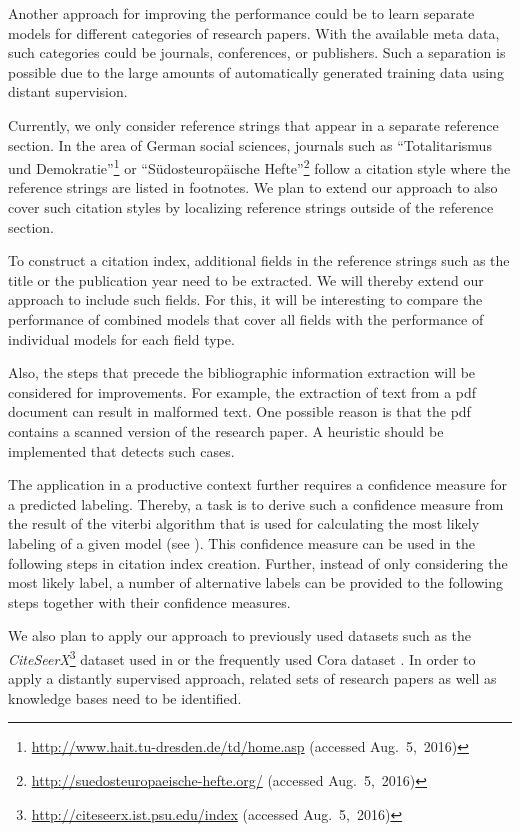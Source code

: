 Another approach for improving the performance could be to learn separate models for different categories of research papers.
With the available meta data, such categories could be journals, conferences, or publishers.
Such a separation is possible due to the large amounts of automatically generated training data using distant supervision.

Currently, we only consider reference strings that appear in a separate reference section.
In the area of German social sciences, journals such as ``Totalitarismus und Demokratie''\footnote{\url{http://www.hait.tu-dresden.de/td/home.asp} (accessed Aug.~5,~2016)} or ``S\"{u}dosteuropäische Hefte''\footnote{\url{http://suedosteuropaeische-hefte.org/} (accessed Aug.~5,~2016)} follow a citation style where the reference strings are listed in footnotes.
We plan to extend our approach to also cover such citation styles by localizing reference strings outside of the reference section.

\bigskip

To construct a citation index, additional fields in the reference strings such as the title or the publication year need to be extracted.
We will thereby extend our approach to include such fields.
For this, it will be interesting to compare the performance of combined models that cover all fields with the performance of individual models for each field type.

Also, the steps that precede the bibliographic information extraction will be considered for improvements.
For example, the extraction of text from a \gls{pdf} document can result in malformed text.
One possible reason is that the \gls{pdf} contains a scanned version of the research paper.
A heuristic should be implemented that detects such cases.

The application in a productive context further requires a confidence measure for a predicted labeling.
Thereby, a task is to derive such a confidence measure from the result of the \gls{viterbi algorithm} that is used for calculating the most likely labeling of a given model (see ).
This confidence measure can be used in the following steps in citation index creation.
Further, instead of only considering the most likely label, a number of alternative labels can be provided to the following steps together with their confidence measures.

\bigskip

We also plan to apply our approach to previously used datasets such as the \textit{CiteSeerX}\footnote{\url{http://citeseerx.ist.psu.edu/index} (accessed Aug.~5,~2016)} dataset used in \citet{councill2008parscit} or the frequently used Cora dataset \citep[e.g.][]{peng2004accurate,councill2008parscit,wu2014citeseerx}.
In order to apply a distantly supervised approach, related sets of research papers as well as knowledge bases need to be identified.

